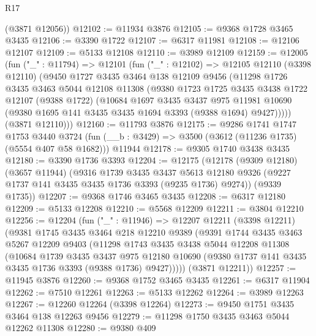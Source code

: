\begin{lexlean}{R17}
\begin{coremodule}
      (@3871 @12056))
@12102 := @11934 @3876
@12105 := @9368 @1728 @3465 @3435
@12106 := @3390 @1722
@12107 := @6317 @11981
@12108 := @12106 @12107
@12109 := @5133 @12108
@12110 := @3989 @12109
@12159 := @12005
    (fun ("_" : @11794) =>
    @12101
      (fun ("_" : @12102) =>
      @12105
        @12110
        (@3398 @12110)
        (@9450
          @1727
          @3435
          @3464
          @138
          @12109
          @9456
          (@11298
            @1726
            @3435
            @3463
            @5044
            @12108
            @11308
            (@9380
              @1723
              @1725
              @3435
              @3438
              @1722
              @12107
              (@9388 @1722)
              (@10684
                @1697
                @3435
                @3437
                @975
                @11981
                @10690
                (@9380 @1695 @141 @3435 @3435 @1694 @3393 (@9388 @1694) @9427)))))
        (@3871 @12110)))
@12160 := @11793 @3876
@12175 := @9286
    @1741
    @1747
    @1753
    @3440
    @3724
    (fun (__b : @3429) => @3500 (@3612 (@11236 @1735) (@5554 @407 @58 @1682)))
    @11944
@12178 := @9305 @1740 @3438 @3435
@12180 := @3390 @1736 @3393
@12204 := @12175
    (@12178
      (@9309 @12180)
      (@3657 @11944)
      (@9316
        @1739
        @3435
        @3437
        @5613
        @12180
        @9326
        (@9227 @1737 @141 @3435 @3435 @1736 @3393 (@9235 @1736) @9274))
      (@9339 @1735))
@12207 := @9368 @1746 @3465 @3435
@12208 := @6317 @12180
@12209 := @5133 @12208
@12210 := @5568 @12209
@12211 := @3804 @12210
@12256 := @12204
    (fun ("_" : @11946) =>
    @12207
      @12211
      (@3398 @12211)
      (@9381
        @1745
        @3435
        @3464
        @218
        @12210
        @9389
        (@9391
          @1744
          @3435
          @3463
          @5267
          @12209
          @9403
          (@11298
            @1743
            @3435
            @3438
            @5044
            @12208
            @11308
            (@10684
              @1739
              @3435
              @3437
              @975
              @12180
              @10690
              (@9380 @1737 @141 @3435 @3435 @1736 @3393 (@9388 @1736) @9427)))))
      (@3871 @12211))
@12257 := @11945 @3876
@12260 := @9368 @1752 @3465 @3435
@12261 := @6317 @11904
@12262 := @7510 @12261
@12263 := @5133 @12262
@12264 := @3989 @12263
@12267 := @12260 @12264 (@3398 @12264)
@12273 := @9450 @1751 @3435 @3464 @138 @12263 @9456
@12279 := @11298 @1750 @3435 @3463 @5044 @12262 @11308
@12280 := @9380 @409

\end{coremodule}
\end{lexlean}
